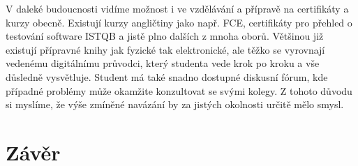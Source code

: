 \documentclass[12pt, a4paper]{report}
\begin{document}
V daleké budoucnosti vidíme možnost i ve vzdělávání a přípravě na certifikáty a kurzy obecně. Existují kurzy angličtiny jako např. FCE, certifikáty pro přehled o testování software ISTQB a jistě plno dalších z mnoha oborů. Většinou již existují přípravné knihy jak fyzické tak elektronické, ale těžko se vyrovnají vedenému digitálnímu průvodci, který studenta vede krok po kroku a vše důsledně vysvětluje. Student má také snadno dostupné diskusní fórum, kde případné problémy může okamžite konzultovat se svými kolegy. Z tohoto důvodu si myslíme, že výše zmíněné navázání by za jistých okolnosti určitě mělo smysl.
\chapter{Závěr}
\label{sec:org6851c0b}
\end{document}
